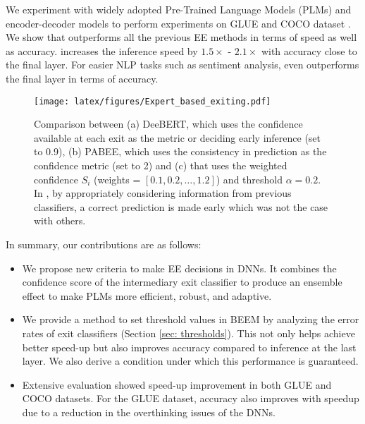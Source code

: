 We experiment with widely adopted Pre-Trained Language Models (PLMs) and encoder-decoder models to perform experiments on GLUE \citep{wang2019glue} and COCO dataset \citep{lin2014microsoft}. We show that \algo{} outperforms all the previous EE methods in terms of speed as well as accuracy. \algo{} increases the inference speed by $1.5\times$ - $2.1\times$ with accuracy close to the final layer. For easier NLP tasks such as sentiment analysis, \algo{} even outperforms the final layer in terms of accuracy.

\begin{figure*}
    \centering
    \texttt{[image: latex/figures/Expert\_based\_exiting.pdf]}
    \caption{Comparison between (a) DeeBERT, which uses the confidence available at each exit as the metric or deciding early inference (set to 0.9), (b) PABEE, which uses the consistency in prediction as the confidence metric (set to 2) and (c) \algo{} that uses the weighted confidence $S_i$ (weights = $[0.1, 0.2, \ldots, 1.2]$) and threshold $\alpha = 0.2$. In \algo{}, by appropriately considering information from previous classifiers, a correct prediction is made early which was not the case with others.}
    \label{fig: Main figure}
    \vspace{-0.39cm}
\end{figure*}

\indent
In summary, our contributions are as follows:
\begin{itemize}
    \item We propose new criteria to make EE decisions in DNNs. It combines the confidence score of the intermediary exit classifier to produce an ensemble effect to make PLMs more efficient, robust, and adaptive.

    \item We provide a method to set threshold values in BEEM by analyzing the error rates of exit classifiers (Section \ref{sec: thresholds}). This not only helps \algo{} achieve better speed-up but also improves accuracy compared to inference at the last layer. We also derive a condition under which this performance is guaranteed. 

    \item Extensive evaluation showed speed-up improvement in both GLUE and COCO datasets. For the GLUE dataset, accuracy also improves with speedup due to a reduction in the overthinking issues of the DNNs.

    
\end{itemize}